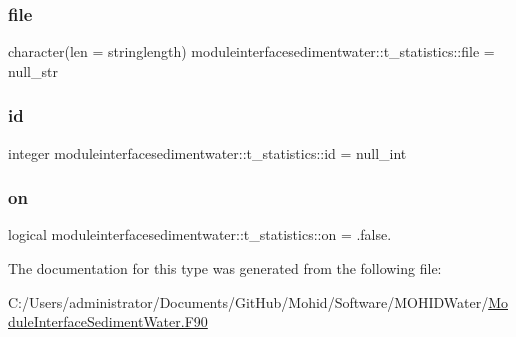 \subsubsection{\texorpdfstring{file}{file}}
{\footnotesize\ttfamily character(len = stringlength) moduleinterfacesedimentwater\+::t\+\_\+statistics\+::file = null\+\_\+str\hspace{0.3cm}{\ttfamily [private]}}

\mbox{\label{structmoduleinterfacesedimentwater_1_1t__statistics_a7dc446c585e8409f26d3375ed1a85e7f}} 
\subsubsection{\texorpdfstring{id}{id}}
{\footnotesize\ttfamily integer moduleinterfacesedimentwater\+::t\+\_\+statistics\+::id = null\+\_\+int\hspace{0.3cm}{\ttfamily [private]}}

\mbox{\label{structmoduleinterfacesedimentwater_1_1t__statistics_abe047cd2da88864de410a0d29a6e7408}} 
\subsubsection{\texorpdfstring{on}{on}}
{\footnotesize\ttfamily logical moduleinterfacesedimentwater\+::t\+\_\+statistics\+::on = .false.\hspace{0.3cm}{\ttfamily [private]}}



The documentation for this type was generated from the following file\+:\begin{DoxyCompactItemize}
\item 
C\+:/\+Users/administrator/\+Documents/\+Git\+Hub/\+Mohid/\+Software/\+M\+O\+H\+I\+D\+Water/\mbox{\hyperlink{_module_interface_sediment_water_8_f90}{Module\+Interface\+Sediment\+Water.\+F90}}\end{DoxyCompactItemize}
